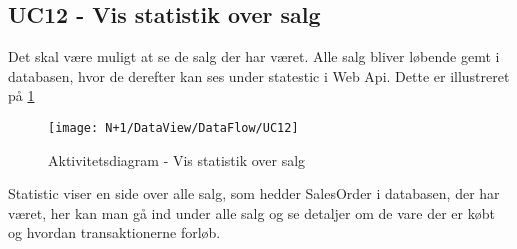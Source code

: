 \subsection{UC12 - Vis statistik over salg}
Det skal være muligt at se de salg der har været. Alle salg bliver løbende gemt i databasen, hvor de derefter kan ses under statestic i Web Api. Dette er illustreret på \ref{fig:AD_UC12}

\begin{figure}[H]
    \centering
    \texttt{[image: N+1/DataView/DataFlow/UC12]}
    \caption{Aktivitetsdiagram - Vis statistik over salg}
    \label{fig:AD_UC12}
\end{figure} 

Statistic viser en side over alle salg, som hedder SalesOrder i databasen, der har været, her kan man gå ind under alle salg og se detaljer om de vare der er købt og hvordan transaktionerne forløb. 